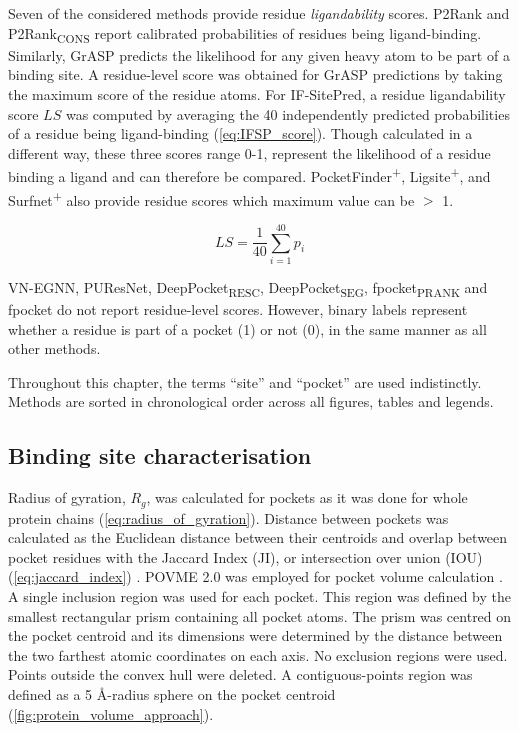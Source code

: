 Seven of the considered methods provide residue \textit{ligandability} scores. P2Rank and P2Rank\textsubscript{CONS} report calibrated probabilities of residues being ligand-binding. Similarly, GrASP predicts the likelihood for any given heavy atom to be part of a binding site. A residue-level score was obtained for GrASP predictions by taking the maximum score of the residue atoms. For IF-SitePred, a residue ligandability score $LS$ was computed by averaging the 40 independently predicted probabilities of a residue being ligand-binding (\autoref{eq:IFSP_score}). Though calculated in a different way, these three scores range 0-1, represent the likelihood of a residue binding a ligand and can therefore be compared. PocketFinder\textsuperscript{+}, Ligsite\textsuperscript{+}, and Surfnet\textsuperscript{+} also provide residue scores which maximum value can be $>$ 1.

\begin{equation}
LS = \frac{1}{40} \sum_{i=1}^{40} p_i
\label{eq:IFSP_score}
\end{equation}

VN-EGNN, PUResNet, DeepPocket\textsubscript{RESC}, DeepPocket\textsubscript{SEG}, fpocket\textsubscript{PRANK} and fpocket do not report residue-level scores. However, binary labels represent whether a residue is part of a pocket (1) or not (0), in the same manner as all other methods.

Throughout this chapter, the terms ``site'' and ``pocket'' are used indistinctly. Methods are sorted in chronological order across all figures, tables and legends.

\subsection{Binding site characterisation}

Radius of gyration, $R_{g}$, was calculated for pockets as it was done for whole protein chains (\autoref{eq:radius_of_gyration}). Distance between pockets was calculated as the Euclidean distance between their centroids and overlap between pocket residues with the Jaccard Index (JI), or intersection over union (IOU) (\autoref{eq:jaccard_index}) \cite{JACCARD_1901_INDEX, JACCARD_1912_INDEX}. POVME 2.0 was employed for pocket volume calculation \cite{DURRANT_2011_POVME, DURRANT_2014_POVME2, WAGNER_2017_POVME3}. A single inclusion region was used for each pocket. This region was defined by the smallest rectangular prism containing all pocket atoms. The prism was centred on the pocket centroid and its dimensions were determined by the distance between the two farthest atomic coordinates on each axis. No exclusion regions were used. Points outside the convex hull were deleted. A contiguous-points region was defined as a 5 \AA{}-radius sphere on the pocket centroid (\autoref{fig:protein_volume_approach}).

